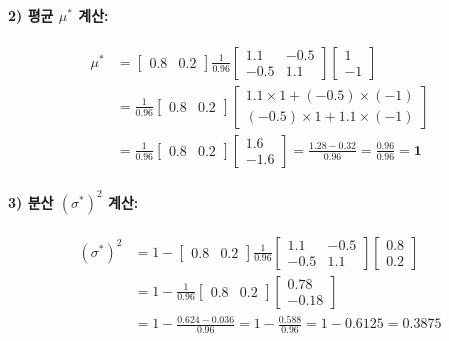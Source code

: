 \documentclass[11pt]{article}
\begin{document}
\paragraph{2) 평균 $\mu^*$ 계산:}
\begin{align*}
    \mu^* &= \begin{bmatrix} 0.8 & 0.2 \end{bmatrix} \frac{1}{0.96} \begin{bmatrix} 1.1 & -0.5 \\ -0.5 & 1.1 \end{bmatrix} \begin{bmatrix} 1 \\ -1 \end{bmatrix} \\
    &= \frac{1}{0.96} \begin{bmatrix} 0.8 & 0.2 \end{bmatrix} \begin{bmatrix} 1.1 \times 1 + (-0.5) \times (-1) \\ (-0.5)\times 1 + 1.1 \times (-1) \end{bmatrix} \\
    &= \frac{1}{0.96} \begin{bmatrix} 0.8 & 0.2 \end{bmatrix} \begin{bmatrix} 1.6 \\ -1.6 \end{bmatrix} = \frac{1.28 - 0.32}{0.96} = \frac{0.96}{0.96} = \mathbf{1}
\end{align*}

\paragraph{3) 분산 $(\sigma^*)^2$ 계산:}
\begin{align*}
    (\sigma^*)^2 &= 1 - \begin{bmatrix} 0.8 & 0.2 \end{bmatrix} \frac{1}{0.96} \begin{bmatrix} 1.1 & -0.5 \\ -0.5 & 1.1 \end{bmatrix} \begin{bmatrix} 0.8 \\ 0.2 \end{bmatrix} \\
    &= 1 - \frac{1}{0.96} \begin{bmatrix} 0.8 & 0.2 \end{bmatrix} \begin{bmatrix} 0.78 \\ -0.18 \end{bmatrix} \\
    &= 1 - \frac{0.624 - 0.036}{0.96} = 1 - \frac{0.588}{0.96} = 1 - 0.6125 = \mathbf{0.3875}
\end{align*}
\end{document}
